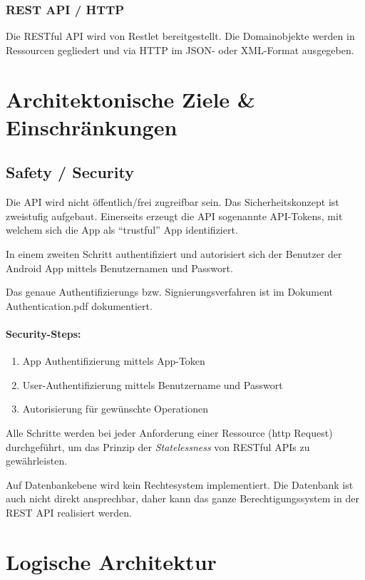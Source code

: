\documentclass[10pt,a4paper]{scrartcl}
\begin{document}
\subsubsection{REST API / HTTP}

Die RESTful API wird von Restlet bereitgestellt. Die Domainobjekte werden in Ressourcen gegliedert
und via HTTP im JSON- oder XML-Format ausgegeben.


\section{Architektonische Ziele \& Einschränkungen}

\subsection{Safety / Security}

Die API wird nicht öffentlich/frei zugreifbar sein. Das Sicherheitskonzept ist zweistufig aufgebaut.
Einerseits erzeugt die API sogenannte API-Tokens, mit welchem sich die App als "`trustful"' App identifiziert.

In einem zweiten Schritt authentifiziert und autorisiert sich der Benutzer der Android App mittels
Benutzernamen und Passwort.

Das genaue Authentifizierungs bzw. Signierungsverfahren ist im Dokument Authentication.pdf dokumentiert.

\paragraph*{Security-Steps:}

\begin{enumerate}
	\item App Authentifizierung mittels App-Token
	\item User-Authentifizierung mittels Benutzername und Passwort
	\item Autorisierung für gewünschte Operationen
\end{enumerate}
 
Alle Schritte werden bei jeder Anforderung einer Ressource (http Request) durchgeführt, um das
Prinzip der \textit{Statelessness} von RESTful APIs zu gewährleisten.

Auf Datenbankebene wird kein Rechtesystem implementiert. Die Datenbank ist auch nicht direkt
ansprechbar, daher kann das ganze Berechtigungssystem in der REST API realisiert werden.


\section{Logische Architektur}
\end{document}

